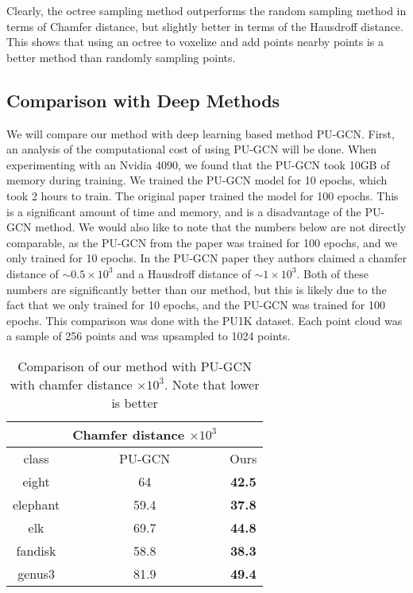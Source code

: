 Clearly, the octree sampling method outperforms the random sampling method in terms of Chamfer distance, but slightly better in terms of the Hausdroff distance.
This shows that using an octree to voxelize and add points nearby points is a better method than randomly sampling points.

\subsection{Comparison with Deep Methods}

We will compare our method with deep learning based method PU-GCN\cite{PU-GCN}.
First, an analysis of the computational cost of using PU-GCN will be done. 
When experimenting with an Nvidia 4090, we found that the PU-GCN took 10GB of memory during training.
We trained the PU-GCN model for 10 epochs, which took 2 hours to train.
The original paper trained the model for 100 epochs. 
This is a significant amount of time and memory, and is a disadvantage of the PU-GCN method.
We would also like to note that the numbers below are not directly comparable, as the PU-GCN from the paper was trained for 100 epochs, and we only trained for 10 epochs.
In the PU-GCN paper they authors claimed a chamfer distance of $\sim 0.5 \times 10^3$ and a Hausdroff distance of $\sim 1 \times 10^3$.
Both of these numbers are significantly better than our method, but this is likely due to the fact that we only trained for 10 epochs, and the PU-GCN was trained for 100 epochs.
This comparison was done with the PU1K dataset. Each point cloud was a sample of 256 points and was upsampled to 1024 points. 

\begin{table}[H]
\centering
\begin{tabular}{ccc}
	& Chamfer distance $\times 10^3$ &\\
	\hline
	class & PU-GCN & Ours \\
	\hline
	eight & {64} & \textbf{42.5} \\ 
	elephant & {59.4} & \textbf{37.8} \\
	elk & {69.7} & \textbf{44.8} \\  
	fandisk & {58.8} & \textbf{38.3} \\  
	genus3 & {81.9} & \textbf{49.4}  \\
\end{tabular}
\caption{Comparison of our method with PU-GCN with chamfer distance $\times 10^3$. Note that lower is better}
\end{table}


